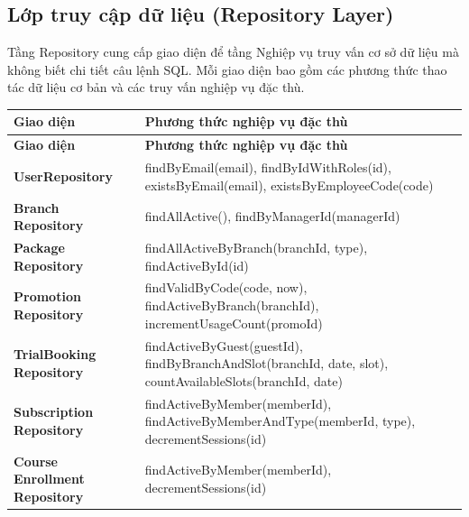 \newpage
\subsection{Lớp truy cập dữ liệu (Repository Layer)}

Tầng Repository cung cấp giao diện để tầng Nghiệp vụ truy vấn
cơ sở dữ liệu mà không biết chi tiết câu lệnh SQL. Mỗi giao diện bao gồm
các phương thức thao tác dữ liệu cơ bản và các truy vấn nghiệp vụ đặc thù.

\begingroup
\renewcommand{\arraystretch}{1.3}
\begin{longtable}{|>{\centering\arraybackslash}m{3.8cm}|>{\ttfamily\raggedright\arraybackslash}m{10.2cm}|}
\hline
\textbf{Giao diện} & \normalfont\textbf{Phương thức nghiệp vụ đặc thù} \\ \hline
\endfirsthead
\hline
\textbf{Giao diện} & \normalfont\textbf{Phương thức nghiệp vụ đặc thù} \\ \hline
\endhead
\hline
\endfoot

\textbf{UserRepository} &
  findByEmail(email),
  findByIdWithRoles(id),
  existsByEmail(email),
  existsByEmployeeCode(code) \\ \hline

\textbf{Branch Repository} &
  findAllActive(),
  findByManagerId(managerId) \\ \hline

\textbf{Package Repository} &
  findAllActiveByBranch(branchId, type),
  findActiveById(id) \\ \hline

\textbf{Promotion Repository} &
  findValidByCode(code, now),
  findActiveByBranch(branchId),
  incrementUsageCount(promoId) \\ \hline

\textbf{TrialBooking Repository} &
  findActiveByGuest(guestId),
  findByBranchAndSlot(branchId, date, slot),
  countAvailableSlots(branchId, date) \\ \hline

\textbf{Subscription Repository} &
  findActiveByMember(memberId),
  findActiveByMemberAndType(memberId, type),
  decrementSessions(id) \\ \hline

\textbf{Course Enrollment Repository} &
  findActiveByMember(memberId),
  decrementSessions(id) \\ \hline


\end{longtable}
